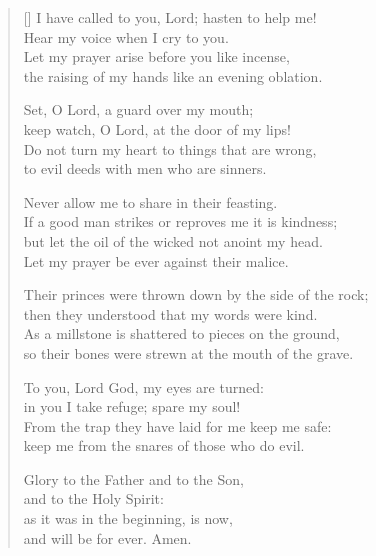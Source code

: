 \settowidth{\versewidth}{Their princes were thrown down by the side of the rock;}
\begin{verse}[\versewidth]
I have called to you, Lord; hasten to help me!\\
    Hear my voice when I cry to you.\\
Let my prayer arise before you like incense,\\
    the raising of my hands like an evening oblation.

Set, O Lord, a guard over my mouth;\\
    keep watch, O Lord, at the door of my lips!\\
Do not turn my heart to things that are wrong,\\
    to evil deeds with men who are sinners.

Never allow me to share in their feasting.\\
    If a good man strikes or reproves me it is kindness;\\
but let the oil of the wicked not anoint my head.\\
    Let my prayer be ever against their malice.

Their princes were thrown down by the side of the rock;\\
    then they understood that my words were kind.\\
As a millstone is shattered to pieces on the ground,\\
    so their bones were strewn at the mouth of the grave.

To you, Lord God, my eyes are turned:\\
    in you I take refuge; spare my soul!\\
From the trap they have laid for me keep me safe:\\
    keep me from the snares of those who do evil.

Glory to the Father and to the Son,\\
    and to the Holy Spirit:\\
as it was in the beginning, is now,\\
    and will be for ever. Amen.
\end{verse}
